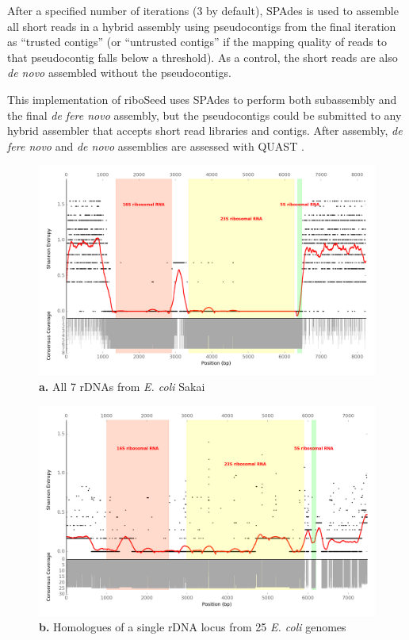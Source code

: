 \documentclass[a4,center,fleqn]{NAR}
\begin{document}
After a specified number of iterations (3 by default), SPAdes is used to assemble all short reads in a hybrid assembly using pseudocontigs from the final iteration as ``trusted contigs'' (or ``untrusted contigs'' if the mapping quality of reads to that pseudocontig falls below a threshold). As a control, the short reads are also \textit{de novo} assembled without the pseudocontigs.


This implementation of riboSeed uses SPAdes to perform both subassembly and the final \textit{de fere novo} assembly, but the pseudocontigs could be submitted to any hybrid assembler that accepts short read libraries and contigs. After assembly, \textit{de fere novo} and \textit{de novo} assemblies are assessed with QUAST \cite{Gurevich2013}.

\begin{figure}[!t]
  \centering
  \begin{minipage}{.5\textwidth}
  \centering
      \includegraphics[width=\columnwidth]{entropy_plot}
      {\footnotesize \textbf{a.} All 7 rDNAs from \textit{E. coli} Sakai}
  \end{minipage}%
  \begin{minipage}{.5\textwidth}
  \centering
      \includegraphics[width=\columnwidth]{entropy_plot_gmbH}
      {\footnotesize\textbf{b.} Homologues of a single rDNA locus from 25 \textit{E. coli} genomes}


\end{minipage}
\end{figure}
\end{document}
